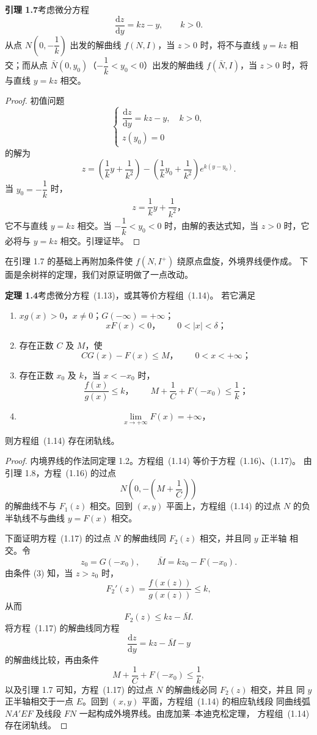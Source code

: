 \noindent\textbf{引理 1.7}\quad 考虑微分方程
\[
  \dfrac{\mathrm{d}z}{\mathrm{d}y}=kz-y,\qquad k>0. \tag{1.24}
\]
从点 $N(0,-\dfrac1k)$ 出发的解曲线 $f(N,I)$，当 $z>0$ 时，将不与直线
$y=kz$ 相交；而从点 $\bar N(0,y_0)$（$-\dfrac1k<y_0<0$）出发的解曲线
$f(\bar N,I)$，当 $z>0$ 时，将与直线 $y=kz$ 相交。

\begin{proof}
初值问题
\[
  \begin{cases}
    \dfrac{\mathrm{d}z}{\mathrm{d}y}=kz-y,\quad k>0,\\
    z(y_0)=0
  \end{cases}
\]
的解为
\[
  z=\left(\dfrac1ky+\dfrac1{k^2}\right)
  -\left(\dfrac1ky_0+\dfrac1{k^2}\right)e^{k(y-y_0)}.
\]
当 $y_0=-\dfrac1k$ 时，
\[
  z=\dfrac1ky+\dfrac1{k^2}，
\]
它不与直线 $y=kz$ 相交。当 $-\dfrac1k<y_0<0$ 时，由解的表达式知，当
$z>0$ 时，它必将与 $y=kz$ 相交。引理证毕。
\end{proof}

在引理 1.7 的基础上再附加条件使 $f(N,I^+)$ 绕原点盘旋，外境界线便作成。
下面是余树祥的定理\cite{16}，我们对原证明做了一点改动。

\noindent\textbf{定理 1.4}\quad 考虑微分方程~(1.13)，或其等价方程组~(1.14)。
若它满足
\begin{enumerate}
  \item $xg(x)>0$，$x\ne0$；$G(-\infty)=+\infty$；
  \[
    xF(x)<0，\qquad0<|x|<\delta；
  \]
  \item 存在正数 $C$ 及 $M$，使
  \[
    CG(x)-F(x)\leq M，\qquad0<x<+\infty；
  \]
  \item 存在正数 $x_0$ 及 $k$，当 $x<-x_0$ 时，
  \[
    \dfrac{f(x)}{g(x)}\leq k，\qquad
    M+\dfrac1C+F(-x_0)\leq\dfrac1k；
  \]
  \item
  \[
    \lim_{x\to+\infty}F(x)=+\infty，
  \]
\end{enumerate}
则方程组~(1.14) 存在闭轨线。

\begin{proof}
内境界线的作法同定理 1.2。方程组~(1.14) 等价于方程~(1.16)、(1.17)。
由引理 1.8，方程~(1.16) 的过点
\[
  N\left(0,-\left(M+\dfrac1C\right)\right)
\]
的解曲线不与 $F_1(z)$ 相交。回到 $(x,y)$ 平面上，方程组~(1.14) 的过点
$N$ 的负半轨线不与曲线 $y=F(x)$ 相交。

下面证明方程~(1.17) 的过点 $N$ 的解曲线同 $F_2(z)$ 相交，并且同 $y$ 正半轴
相交。令
\[
  z_0=G(-x_0),\qquad \bar M=kz_0-F(-x_0).
\]
由条件 (3) 知，当 $z>z_0$ 时，
\[
  F_2'(z)=\dfrac{f(x(z))}{g(x(z))}\leq k,
\]
从而
\[
  F_2(z)\leq kz-\bar M. \tag{1.26}
\]
将方程~(1.17) 的解曲线同方程
\[
  \dfrac{\mathrm{d}z}{\mathrm{d}y}=kz-\bar M-y
\]
的解曲线比较，再由条件
\[
  M+\dfrac1C+F(-x_0)\leq\dfrac1k,
\]
以及引理 1.7 可知，方程~(1.17) 的过点 $N$ 的解曲线必同 $F_2(z)$ 相交，并且
同 $y$ 正半轴相交于一点 $E$。回到 $(x,y)$ 平面，方程组~(1.14) 的相应轨线段
同曲线弧 $NA'EF$ 及线段 $FN$ 一起构成外境界线。由庞加莱--本迪克松定理，
方程组~(1.14) 存在闭轨线。
\end{proof}

